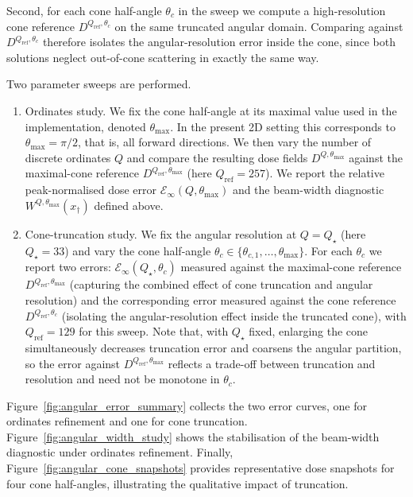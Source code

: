 \documentclass[final]{amsart}
\begin{document}
Second, for each cone half-angle $\theta_c$ in the sweep we compute a
high-resolution cone reference $D^{Q_{\mathrm{ref}},\theta_c}$ on the
same truncated angular domain. Comparing against
$D^{Q_{\mathrm{ref}},\theta_c}$ therefore isolates the
angular-resolution error inside the cone, since both solutions neglect
out-of-cone scattering in exactly the same way.

Two parameter sweeps are performed.

\begin{enumerate}
\item
  Ordinates study. We fix the cone half-angle at its maximal value used in the
  implementation, denoted $\theta_{\max}$. In the present 2D setting this
  corresponds to $\theta_{\max}=\pi/2$, that is, all forward directions.
  We then vary the number of discrete ordinates $Q$ and compare the resulting
  dose fields $D^{Q,\theta_{\max}}$ against the maximal-cone reference
  $D^{Q_{\mathrm{ref}},\theta_{\max}}$ (here $Q_{\mathrm{ref}}=257$). We report the
  relative peak-normalised dose error $\mathcal{E}_\infty(Q,\theta_{\max})$ and
  the beam-width diagnostic $W^{Q,\theta_{\max}}(x_\dagger)$ defined above.

\item
  Cone-truncation study. We fix the angular resolution at $Q=Q_\star$ (here
  $Q_\star=33$) and vary the cone half-angle
  $\theta_c\in\{\theta_{c,1},\dots,\theta_{\max}\}$. For each $\theta_c$ we report
  two errors: $\mathcal{E}_\infty(Q_\star,\theta_c)$ measured against the maximal-cone
  reference $D^{Q_{\mathrm{ref}},\theta_{\max}}$ (capturing the combined effect of
  cone truncation and angular resolution) and the corresponding error measured
  against the cone reference $D^{Q_{\mathrm{ref}},\theta_c}$ (isolating the
  angular-resolution effect inside the truncated cone), with $Q_{\mathrm{ref}}=129$
  for this sweep. Note that, with $Q_\star$ fixed, enlarging the cone simultaneously
  decreases truncation error and coarsens the angular partition, so the error against
  $D^{Q_{\mathrm{ref}},\theta_{\max}}$ reflects a trade-off between truncation and
  resolution and need not be monotone in $\theta_c$.
\end{enumerate}

Figure~\ref{fig:angular_error_summary} collects the two error curves, one for
ordinates refinement and one for cone truncation. Figure~\ref{fig:angular_width_study}
shows the stabilisation of the beam-width diagnostic under ordinates refinement.
Finally, Figure~\ref{fig:angular_cone_snapshots} provides representative dose
snapshots for four cone half-angles, illustrating the qualitative impact of
truncation.
\end{document}
